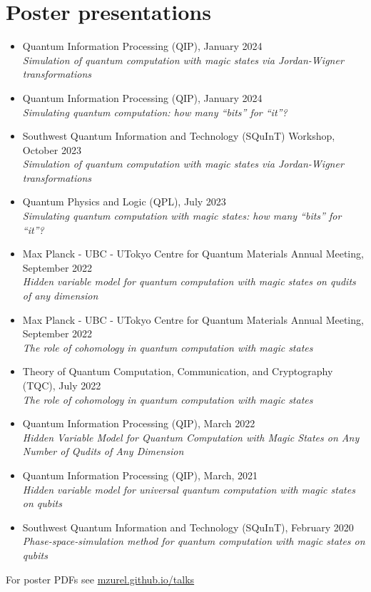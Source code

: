 \documentclass[letterpaper,11pt]{article}
\newcommand{\ConferenceItem}[3]{
	\item{\parbox{0.97\textwidth}{
		{#1}  \hfill {#2}\\
		\emph{#3}
	}}
}
\begin{document}
\section*{Poster presentations}
\begin{itemize}[leftmargin=*]
	\ConferenceItem{Quantum Information Processing (QIP), January 2024}{}{Simulation of quantum computation with magic states via Jordan-Wigner transformations}
	
	\ConferenceItem{Quantum Information Processing (QIP), January 2024}{}{Simulating quantum computation: how many ``bits'' for ``it''?}
	
	\ConferenceItem{Southwest Quantum Information and Technology (SQuInT) Workshop, October 2023}{}{Simulation of quantum computation with magic states via Jordan-Wigner transformations}
	
	\ConferenceItem{Quantum Physics and Logic (QPL), July 2023}{}{Simulating quantum computation with magic states: how many ``bits'' for ``it''?}
	
	\ConferenceItem{Max Planck - UBC - UTokyo Centre for Quantum Materials Annual Meeting, September 2022}{}{Hidden variable model for quantum computation with magic states on qudits of any dimension}
	
	\ConferenceItem{Max Planck - UBC - UTokyo Centre for Quantum Materials Annual Meeting, September 2022}{}{The role of cohomology in quantum computation with magic states}
	
	\ConferenceItem{Theory of Quantum Computation, Communication, and Cryptography (TQC), July 2022}{}{The role of cohomology in quantum computation with magic states}
	
	\ConferenceItem{Quantum Information Processing (QIP), March 2022}{}{Hidden Variable Model for Quantum Computation with Magic States on Any Number of Qudits of Any Dimension}
	
	\ConferenceItem{Quantum Information Processing (QIP), March, 2021}{}{Hidden variable model for universal quantum computation with magic states on qubits}
	
	\ConferenceItem{Southwest Quantum Information and Technology (SQuInT), February 2020}{}{Phase-space-simulation method for quantum computation with magic states on qubits}
\end{itemize}
For poster PDFs see \href{https://mzurel.github.io/talks}{mzurel.github.io/talks}
\end{document}
